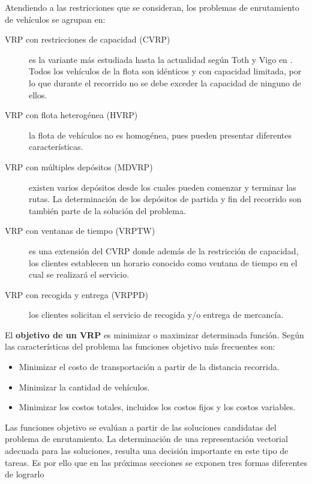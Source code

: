 Atendiendo a las restricciones que se consideran, los problemas de enrutamiento de vehículos se agrupan en:

\begin{description}
	\item [VRP con restricciones de capacidad (CVRP)] es la variante más estudiada hasta la actualidad según Toth y Vigo en \cite{PaoloVigo}. Todos los vehículos de la flota son idénticos y con capacidad limitada, por lo que durante el recorrido no se debe exceder la capacidad de ninguno de ellos. 
	\item [VRP con flota heterogénea (HVRP)] la flota de vehículos no es homogénea, pues pueden presentar diferentes características. 
	\item [VRP con múltiples depósitos (MDVRP)] existen varios depósitos desde los cuales pueden comenzar y terminar las rutas. La determinación de los depósitos de partida y fin del recorrido son también parte de la solución del problema.
	\item [VRP con ventanas de tiempo (VRPTW)] es una extensión del CVRP \cite{PaoloVigo} donde además de la restricción de capacidad, los clientes establecen un horario conocido como ventana de tiempo en el cual se realizará el servicio. 
	\item [VRP con recogida y entrega (VRPPD)] los clientes solicitan el servicio de recogida y/o entrega de mercancía. 
\end{description}

El \textbf{objetivo de un VRP} es minimizar o maximizar determinada función. Según las características del problema las funciones objetivo  más frecuentes son:
\begin{itemize}
	\item Minimizar el costo de transportación a partir de la distancia recorrida.
	\item Minimizar la cantidad de vehículos.
	\item Minimizar los costos totales, incluidos los costos fijos y los costos variables.
\end{itemize}


Las funciones objetivo se evalúan a partir de las soluciones candidatas del problema de enrutamiento. La determinación de una representación vectorial adecuada para las soluciones, resulta una decisión importante en este tipo de tareas. Es por ello que en las próximas secciones se exponen tres formas diferentes de lograrlo


